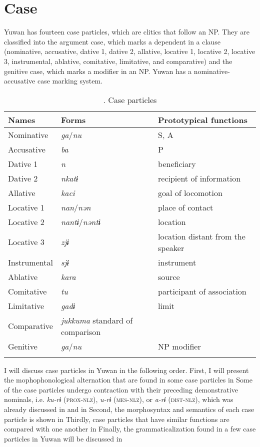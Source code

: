 \section{Case}

Yuwan has fourteen case particles, which are clitics that follow an NP. They are classified into the argument case, which marks a dependent in a clause (nominative, accusative, dative 1, dative 2, allative, locative 1, locative 2, locative 3, instrumental, ablative, comitative, limitative, and comparative) and the genitive case, which marks a modifier in an NP. Yuwan has a nominative-accusative case marking system.

\begin{table}
\caption{\label{tab:key:40}. Case particles}
\begin{tabularx}{\textwidth}{XXX}
\lsptoprule
Names & Forms & Prototypical functions \\
\midrule
Nominative & \textit{ga}/\textit{nu} & S, A \\
Accusative & \textit{ba} & P \\
Dative 1 & \textit{n} & beneficiary \\
Dative 2 & \textit{nkatɨ} & recipient of information \\
Allative & \textit{kaci} & goal of locomotion \\
Locative 1 & \textit{nan}/\textit{nən} & place of contact \\
Locative 2 & \textit{nantɨ}/\textit{nəntɨ}& location \\
Locative 3 & \textit{zjɨ} & location distant from the speaker \\
Instrumental & \textit{sjɨ} & instrument \\
Ablative & \textit{kara} & source \\
Comitative & \textit{tu} & participant of association \\
Limitative & \textit{gadɨ} & limit \\
Comparative & \textit{jukkuma} standard of comparison \\
Genitive & \textit{ga}/\textit{nu} & NP modifier \\
\lspbottomrule
\end{tabularx}
\end{table}
I will discuss case particles in Yuwan in the following order. First, I will present the mophophonological alternation that are found in some case particles in  Some of the case particles undergo contraction with their preceding demonstrative nominals, i.e. \textit{ku-rɨ} (\textsc{prox}-\textsc{nlz}), \textit{u-rɨ} (\textsc{mes}-\textsc{nlz}), or \textit{a-rɨ} (\textsc{dist}-\textsc{nlz}), which was already discussed in  and  in  Second, the morphosyntax and semantics of each case particle is shown in  Thirdly, case particles that have similar functions are compared with one another in  Finally, the grammaticalization found in a few case particles in Yuwan will be discussed in 

